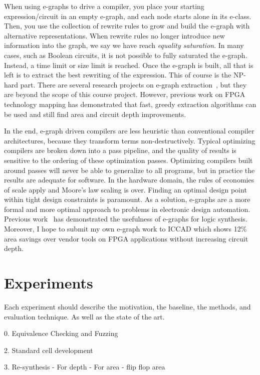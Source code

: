 \documentclass[10pt,letterpaper]{article}
\begin{document}
When using e-graphs to drive a compiler, you place your starting
expression/circuit in an empty e-graph, and each node starts alone in its
e-class. Then, you use the collection of rewrite rules to grow and build the
e-graph with alternative representations. When rewrite rules no longer
introduce new information into the graph, we say we have reach \textit{equality
    saturation}. In many cases, such as Boolean circuits, it is not possible to
fully saturated the e-graph. Instead, a time limit or size limit is reached.
Once the e-graph is built, all that is left is to extract the best rewriting of
the expression. This of course is the NP-hard part. There are several research
projects on e-graph extraction~\cite{smoothe,sparsextract}, but they are beyond
the scope of this course project. However, previous work on FPGA technology
mapping has demonstrated that fast, greedy extraction algorithms can be used
and still find area and circuit depth improvements.

In the end, e-graph driven compilers are less heuristic than conventional
compiler architectures, because they transform terms non-destructively. Typical
optimizing compilers are broken down into a pass pipeline, and the quality of
results is sensitive to the ordering of these optimization passes. Optimizing
compilers built around passes will never be able to generalize to all programs,
but in practice the results are adequate for software. In the hardware domain,
the rules of economies of scale apply and Moore's law scaling is over. Finding
an optimal design point within tight design constraints is paramount. As a
solution, e-graphs are a more formal and more optimal approach to problems in
electronic design automation. Previous work~\cite{esyn} has demonstrated the
usefulness of e-graphs for logic synthesis. Moreover, I hope to submit my own
e-graph work to ICCAD which shows 12\% area savings over vendor tools on FPGA
applications without increasing circuit depth.

\section{Experiments}\label{sec:experiments}

Each experiment should describe the motivation, the baseline, the methods, and
evaluation technique. As well as the state of the art.

0. Equivalence Checking and Fuzzing

2. Standard cell development

3. Re-synthesis
- For depth
- For area
- flip flop area
\end{document}
